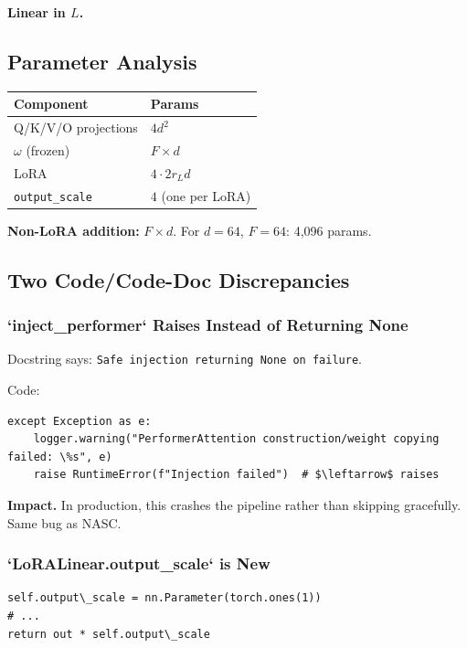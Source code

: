 \textbf{Linear in $L$.}

\subsection{Parameter Analysis}

\begin{table}[H]
\centering
\small
\begin{tabular}{ll}
\toprule
\textbf{Component} & \textbf{Params} \\
\midrule
Q/K/V/O projections & $4 d^2$ \\
$\omega$ (frozen) & $F \times d$ \\
LoRA & $4 \cdot 2 r_L d$ \\
\texttt{output\_scale} & $4$ (one per LoRA) \\
\bottomrule
\end{tabular}
\end{table}

\textbf{Non-LoRA addition:} $F \times d$. For $d = 64$, $F = 64$: 4,096 params.

\subsection{Two Code/Code-Doc Discrepancies}

\subsubsection{`inject\_performer` Raises Instead of Returning None}

Docstring says: \texttt{Safe injection returning None on failure}.

Code:

\begin{lstlisting}
except Exception as e:
    logger.warning("PerformerAttention construction/weight copying failed: \%s", e)
    raise RuntimeError(f"Injection failed")  # $\leftarrow$ raises
\end{lstlisting}

\textbf{Impact.} In production, this crashes the pipeline rather than skipping 
gracefully. Same bug as NASC.

\subsubsection{`LoRALinear.output\_scale` is New}

\begin{lstlisting}
self.output\_scale = nn.Parameter(torch.ones(1))
# ...
return out * self.output\_scale
\end{lstlisting}

